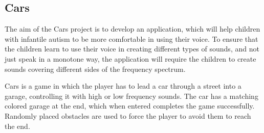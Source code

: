 \subsection{Cars}
\label{sub:cars}
The aim of the Cars project is to develop an application, which will help children with infantile autism to be more comfortable in using their voice. To ensure that the children learn to use their voice in creating different types of sounds, and not just speak in a monotone way, the application will require the children to create sounds covering different sides of the frequency spectrum.

Cars is a game in which the player has to lead a car through a street into a garage, controlling it with high or low frequency sounds. The car has a matching colored garage at the end, which when entered completes the game successfully.
Randomly placed obstacles are used to force the player to avoid them to reach the end.
